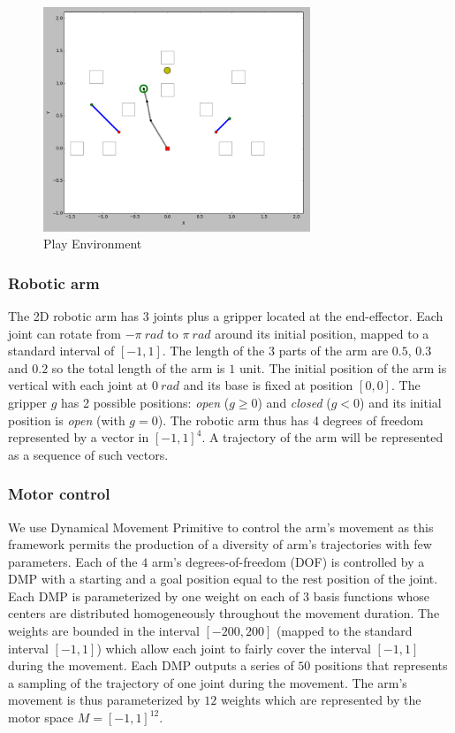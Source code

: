 \documentclass[10pt,letterpaper]{article}
\begin{document}
		\begin{figure}[h]
			\centering
			\includegraphics[width=8cm]{./include/tools.png}
			\caption{Play Environment}
			\label{env}
		\end{figure}
			

		\subsubsection{Robotic arm}
		
			The 2D robotic arm has 3 joints plus a gripper located at the end-effector.
			Each joint can rotate from $-\pi~rad$ to $\pi~rad$ around its initial position, mapped to a standard interval of $[-1,1]$.
			The length of the 3 parts of the arm are $0.5$, $0.3$ and $0.2$ so the total length of the arm is $1$ unit.
			The initial position of the arm is vertical with each joint at $0~rad$ and its base is fixed at position $[0, 0]$.
			The gripper $g$ has 2 possible positions: \textit{open} ($g \geq 0$) and \textit{closed} ($g < 0$) and its initial position is \textit{open} (with $g = 0$).
			The robotic arm thus has 4 degrees of freedom represented by a vector in $[-1,1]^4$.
			A trajectory of the arm will be represented as a sequence of such vectors.\\
		
		
		\subsubsection{Motor control}
		
			We use Dynamical Movement Primitive \cite{ijspeert_dynamical_2013} to control the arm's movement as this framework permits the production of a diversity of arm's trajectories with few parameters.
			Each of the $4$ arm's degrees-of-freedom (DOF) is controlled by a DMP with a starting and a goal position equal to the rest position of the joint.
			Each DMP is parameterized by one weight on each of $3$ basis functions whose centers are distributed homogeneously throughout the movement duration.
			The weights are bounded in the interval $[-200,200]$ (mapped to the standard interval $[-1,1]$) which allow each joint to fairly cover the interval $[-1,1]$ during the movement.
			Each DMP outputs a series of $50$ positions that represents a sampling of the trajectory of one joint during the movement.		
			The arm's movement is thus parameterized by $12$ weights which are represented by the motor space $M=[-1,1]^{12}$.\\
		
\end{document}
